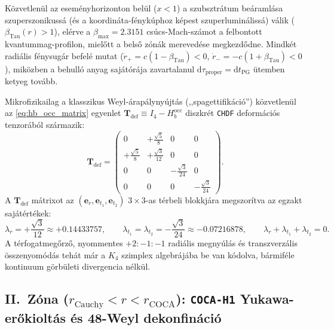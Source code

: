 \documentclass[11pt,a4paper]{article}
\theoremstyle{remark}
\begin{document}
K\"ozvetlen\"ul az esem\'enyhorizonton bel\"ul ($x < 1$) a szubsztr\'atum be\'araml\'asa szuperszonikuss\'a (\'es a koordin\'ata-f\'enyk\'uphoz k\'epest szuperlumin\'aliss\'a) v\'alik ($\beta_{\mathrm{Tau}}(r) > 1$), el\'erve a $\beta_{\max} = 2.3151$ cs\'ucs-Mach-sz\'amot a felbontott kvantummag-profilon, miel\H{o}tt a bels\H{o} z\'on\'ak mereved\'ese megkezd\H{o}dne. Mindk\'et radi\'alis f\'enysug\'ar befel\'e mutat ($\dot{r}_+ = c(1 - \beta_{\mathrm{Tau}}) < 0$, $\dot{r}_- = -c(1 + \beta_{\mathrm{Tau}}) < 0$), mik\"ozben a behull\'o anyag saj\'at\'or\'aja zavartalanul $\mathrm{d}\tau_{\mathrm{proper}} = \mathrm{d}t_{\mathrm{PG}}$ \"utemben ketyeg tov\'abb.

Mikrofizikailag a klasszikus Weyl-\'arap\'alyny\'ujt\'as (,,spagettifik\'aci\'o'') k\"ozvetlen\"ul az \eqref{eq:hb_occ_matrix} egyenlet $\mathbf{T}_{\mathrm{def}} \equiv I_4 - H_b^{\mathrm{occ}}$ diszkr\'et \texttt{CHDF} deform\'aci\'os tenzor\'ab\'ol sz\'armazik:
\begin{equation}
  \mathbf{T}_{\mathrm{def}} =
  \begin{pmatrix}
    0 & +\frac{\sqrt{5}}{8} & 0 & 0 \\[4pt]
    +\frac{\sqrt{5}}{8} & +\frac{\sqrt{3}}{12} & 0 & 0 \\[4pt]
    0 & 0 & -\frac{\sqrt{3}}{24} & 0 \\[4pt]
    0 & 0 & 0 & -\frac{\sqrt{3}}{24}
  \end{pmatrix}.
  \label{eq:tdef_matrix}
\end{equation}
A $\mathbf{T}_{\mathrm{def}}$ m\'atrixot az $(\mathbf{e}_r, \mathbf{e}_{t_1}, \mathbf{e}_{t_2})$ $3\times 3$-as t\'erbeli blokkj\'ara megszor\'itva az egzakt saj\'at\'ert\'ekek:
\begin{equation}
  \lambda_r = +\frac{\sqrt{3}}{12} \approx +0.14433757, \qquad
  \lambda_{t_1} = \lambda_{t_2} = -\frac{\sqrt{3}}{24} \approx -0.07216878, \qquad
  \lambda_r + \lambda_{t_1} + \lambda_{t_2} = 0.
  \label{eq:tidal_eigenvalues}
\end{equation}
A t\'erfogatmeg\H{o}rz\H{o}, nyommentes $+2 : -1 : -1$ radi\'alis megny\'ul\'as \'es transzverz\'alis \"osszenyom\'od\'as teh\'at m\'ar a $K_4$ szimplex algebr\'aj\'aba be van k\'odolva, b\'armif\'ele kontinuum g\"orb\"uleti divergencia n\'elk\"ul.

\subsection{II.\ Z\'ona (\texorpdfstring{$r_{\mathrm{Cauchy}} < r < r_{\mathrm{COCA}}$}{r\_Cauchy < r < r\_COCA}): \texttt{COCA-H1} Yukawa-er\H{o}kiolt\'as \'es 48-Weyl dekonfin\'aci\'o}
\end{document}
